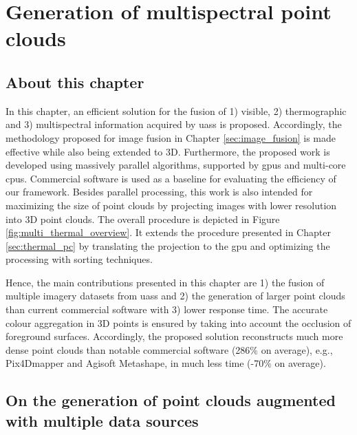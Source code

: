 \setchapterpreamble[u]{\margintoc}
\chapter{Generation of multispectral point clouds}
\label{sec:multispectral_pc}

\section*{About this chapter}

In this chapter, an efficient solution for the fusion of 1) visible, 2) thermographic and 3) multispectral information acquired by \acrshort{uas}s is proposed. Accordingly, the methodology proposed for image fusion in Chapter \ref{sec:image_fusion} is made effective while also being extended to 3D. Furthermore, the proposed work is developed using massively parallel algorithms, supported by \acrshort{gpu}s and multi-core \acrshort{cpu}s. Commercial software is used as a baseline for evaluating the efficiency of our framework. Besides parallel processing, this work is also intended for maximizing the size of point clouds by projecting images with lower resolution into 3D point clouds. The overall procedure is depicted in Figure \ref{fig:multi_thermal_overview}. It extends the procedure presented in Chapter \ref{sec:thermal_pc} by translating the projection to the \acrshort{gpu} and optimizing the processing with sorting techniques.

Hence, the main contributions presented in this chapter are 1) the fusion of multiple imagery datasets from \acrshort{uas}s and 2) the generation of larger point clouds than current commercial software with 3) lower response time. The accurate colour aggregation in 3D points is ensured by taking into account the occlusion of foreground surfaces. Accordingly, the proposed solution reconstructs much more dense point clouds than notable commercial software (286\% on average), e.g., Pix4Dmapper and Agisoft Metashape, in much less time (-70\% on average). 

\section{On the generation of point clouds augmented with multiple data sources}

